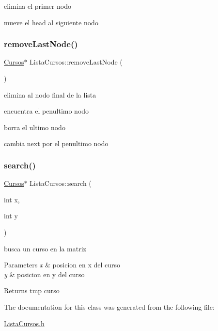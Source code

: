 elimina el primer nodo 

mueve el head al siguiente nodo\mbox{\label{classListaCursos_a7832eb4a5ece08c1467228673a621af1}} 
\subsubsection{\texorpdfstring{remove\+Last\+Node()}{removeLastNode()}}
{\footnotesize\ttfamily \hyperlink{classCursos}{Cursos}$\ast$ Lista\+Cursos\+::remove\+Last\+Node (\begin{DoxyParamCaption}{ }\end{DoxyParamCaption})\hspace{0.3cm}{\ttfamily [inline]}}



elimina al nodo final de la lista 

encuentra el penultimo nodo

borra el ultimo nodo

cambia next por el penultimo nodo\mbox{\label{classListaCursos_a9a91363330c922741a5204bc89be5f16}} 
\subsubsection{\texorpdfstring{search()}{search()}}
{\footnotesize\ttfamily \hyperlink{classCursos}{Cursos}$\ast$ Lista\+Cursos\+::search (\begin{DoxyParamCaption}\item[{int}]{x,  }\item[{int}]{y }\end{DoxyParamCaption})\hspace{0.3cm}{\ttfamily [inline]}}



busca un curso en la matriz 


\begin{DoxyParams}{Parameters}
{\em x} & posicion en x del curso \\
\hline
{\em y} & posicion en y del curso \\
\hline
\end{DoxyParams}
\begin{DoxyReturn}{Returns}
tmp curso 
\end{DoxyReturn}


The documentation for this class was generated from the following file\+:\begin{DoxyCompactItemize}
\item 
\hyperlink{ListaCursos_8h}{Lista\+Cursos.\+h}\end{DoxyCompactItemize}

